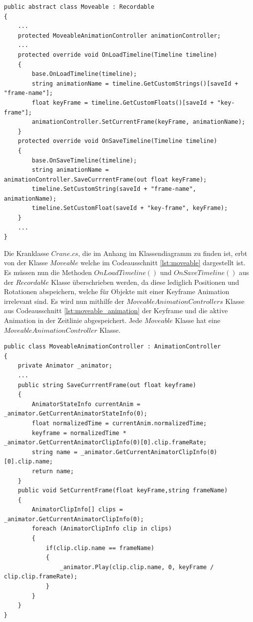 \begin{lstlisting}[caption={Ausschnitt aus Moveable.cs Klasse}, label={lst:moveable}]
public abstract class Moveable : Recordable
{
    ...
    protected MoveableAnimationController animationController;
    ...
    protected override void OnLoadTimeline(Timeline timeline)
    {
        base.OnLoadTimeline(timeline);
        string animationName = timeline.GetCustomStrings()[saveId + "frame-name"];
        float keyFrame = timeline.GetCustomFloats()[saveId + "key-frame"];
        animationController.SetCurrentFrame(keyFrame, animationName);
    }
    protected override void OnSaveTimeline(Timeline timeline)
    {
        base.OnSaveTimeline(timeline);
        string animationName = animationController.SaveCurrrentFrame(out float keyFrame);
        timeline.SetCustomString(saveId + "frame-name", animationName);
        timeline.SetCustomFloat(saveId + "key-frame", keyFrame);
    }
    ...
}
\end{lstlisting}

Die Kranklasse $Crane.cs$, die im Anhang im Klassendiagramm zu finden ist, erbt von der Klasse $Moveable$ welche im Codeausschnitt \ref{lst:moveable} dargestellt ist. Es müssen nun die Methoden $OnLoadTimeline()$ und $OnSaveTimeline()$ aus der $Recordable$ Klasse überschrieben werden, da diese lediglich Positionen und Rotationen abspeichern, welche für Objekte mit einer Keyframe Animation irrelevant sind. Es wird nun mithilfe der $MoveableAnimationControllers$ Klasse aus Codeausschnitt \ref{lst:moveable_animation} der Keyframe und die aktive Animation in der Zeitlinie abgespeichert. Jede $Moveable$ Klasse hat eine $MoveableAnimationController$ Klasse.

\begin{lstlisting}[caption={Ausschnitt aus MoveableAnimationController.cs Klasse}, label={lst:moveable_animation}]
public class MoveableAnimationController : AnimationController
{
    private Animator _animator;
    ...
    public string SaveCurrrentFrame(out float keyframe)
    {
        AnimatorStateInfo currentAnim = _animator.GetCurrentAnimatorStateInfo(0);
        float normalizedTime = currentAnim.normalizedTime;
        keyframe = normalizedTime * _animator.GetCurrentAnimatorClipInfo(0)[0].clip.frameRate;
        string name = _animator.GetCurrentAnimatorClipInfo(0)[0].clip.name;
        return name;
    }
    public void SetCurrentFrame(float keyFrame,string frameName)
    {
        AnimatorClipInfo[] clips = _animator.GetCurrentAnimatorClipInfo(0);
        foreach (AnimatorClipInfo clip in clips)
        {
            if(clip.clip.name == frameName)
            {
                _animator.Play(clip.clip.name, 0, keyFrame / clip.clip.frameRate);
            }
        }
    }
}
\end{lstlisting}


